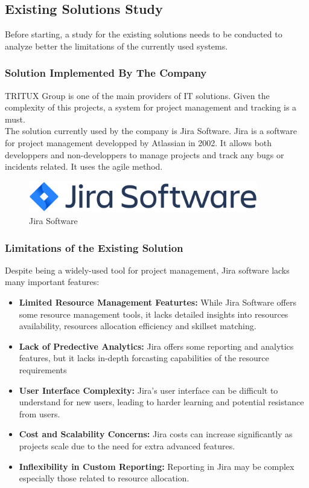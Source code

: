 \documentclass[11pt, a4paper]{report}
\begin{document}
    \newpage
      \thispagestyle{plain}
      \subsection{Existing Solutions Study}
        Before starting, a study for the existing solutions needs to be conducted to analyze better the limitations of the currently used systems.
        \subsubsection{Solution Implemented By The Company}
          TRITUX Group is one of the main providers of IT solutions. Given the complexity of this projects, a system for project management and tracking is a must.\\
          The solution currently used by the company is Jira Software. Jira is a software for project management developped by Atlassian in 2002. It allows both developpers and non-developpers to manage projects and track any bugs or incidents related. It uses the agile method.\\
          \begin{figure}[h]
            \centering
            \includegraphics[width=10cm]{Logos/jira.png}
            \caption{Jira Software}        
          \end{figure}
        \subsubsection{Limitations of the Existing Solution}
          Despite being a widely-used tool for project management, Jira software lacks many important features:
          \begin{itemize}
            \item \textbf{Limited Resource Management Featurtes: }While Jira Software offers some resource management tools, it lacks detailed insights into resources availability, resources allocation efficiency and skillset matching.   
            \item \textbf{Lack of Predective Analytics: }Jira offers some reporting and analytics features, but it lacks in-depth forcasting capabilities of the resource requirements    
            \item \textbf{User Interface Complexity: }Jira's user interface can be difficult to understand for new users, leading to harder learning and potential resistance from users.
            \item \textbf{Cost and Scalability Concerns: }Jira costs can increase significantly as projects scale due to the need for extra advanced features.
            \item \textbf{Inflexibility in Custom Reporting: }Reporting in Jira may be complex especially those related to resource allocation.
          \end{itemize} 
    \newpage
      \thispagestyle{plain}
\end{document}
